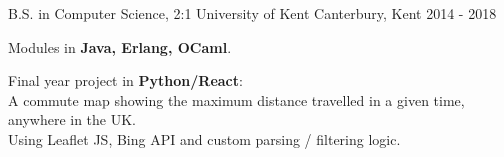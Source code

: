 

\begin{cventries}

  \cventry
    {B.S. in Computer Science, 2:1} %
    {University of Kent} %
    {Canterbury, Kent} %
    {2014 - 2018} %
    {
      \begin{cvitems} %
          \item {Modules in \textbf{Java, Erlang, OCaml}.}
          \item {Final year project in \textbf{Python/React}:\\A commute map showing the maximum distance travelled in a given time, anywhere in the UK.\\Using Leaflet JS, Bing API and custom parsing / filtering logic.}
      \end{cvitems}
    }

\end{cventries}
